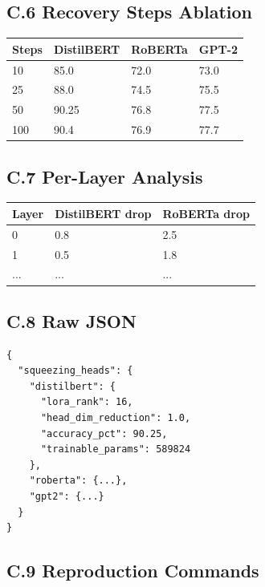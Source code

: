 \subsection{C.6 Recovery Steps Ablation}

\begin{table}[H]
\centering
\small
\begin{tabular}{llll}
\toprule
\textbf{Steps} & \textbf{DistilBERT} & \textbf{RoBERTa} & \textbf{GPT-2} \\
\midrule
10 & 85.0 & 72.0 & 73.0 \\
25 & 88.0 & 74.5 & 75.5 \\
50 & 90.25 & 76.8 & 77.5 \\
100 & 90.4 & 76.9 & 77.7 \\
\bottomrule
\end{tabular}
\end{table}

\subsection{C.7 Per-Layer Analysis}

\begin{table}[H]
\centering
\small
\begin{tabular}{lll}
\toprule
\textbf{Layer} & \textbf{DistilBERT drop} & \textbf{RoBERTa drop} \\
\midrule
0 & 0.8 & 2.5 \\
1 & 0.5 & 1.8 \\
... & ... & ... \\
\bottomrule
\end{tabular}
\end{table}

\subsection{C.8 Raw JSON}

\begin{lstlisting}
{
  "squeezing_heads": {
    "distilbert": {
      "lora_rank": 16,
      "head_dim_reduction": 1.0,
      "accuracy_pct": 90.25,
      "trainable_params": 589824
    },
    "roberta": {...},
    "gpt2": {...}
  }
}
\end{lstlisting}

\subsection{C.9 Reproduction Commands}

